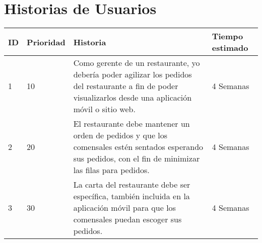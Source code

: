 \chapter{Historias de Usuarios}







\begin{table}[htbp]
	\begin{center}
		\begin{tabular}{| p{1.0cm}| p{2.0cm} | p{7.0cm}| p{4.0cm} |}
			\hline
			
			\textbf{ID} & \textbf {Prioridad} & \textbf{Historia} & \textbf{Tiempo estimado}
			
			\\\hline
			1 & 10 &
			
			Como gerente de un restaurante, yo debería poder agilizar los pedidos del restaurante a fin de poder visualizarlos desde una aplicación móvil o sitio web.
			
			& 4 Semanas
			
			\\\hline
			2 & 20 & 
			
			El restaurante debe mantener un orden de pedidos y que los comensales estén sentados esperando sus pedidos, con el fin de minimizar las filas para pedidos.
			
			& 4 Semanas
			
			\\\hline
			3 & 30	& 
			
			La carta del restaurante debe ser específica, también incluida en la aplicación móvil para que los comensales puedan escoger sus pedidos.
			
			& 4 Semanas \\\hline
		\end{tabular}
	\end{center}
\end{table}